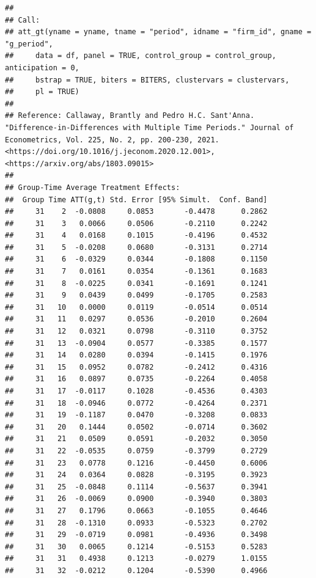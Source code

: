 \documentclass[
]{article}
\begin{document}
\begin{verbatim}
## 
## Call:
## att_gt(yname = yname, tname = "period", idname = "firm_id", gname = "g_period", 
##     data = df, panel = TRUE, control_group = control_group, anticipation = 0, 
##     bstrap = TRUE, biters = BITERS, clustervars = clustervars, 
##     pl = TRUE)
## 
## Reference: Callaway, Brantly and Pedro H.C. Sant'Anna.  "Difference-in-Differences with Multiple Time Periods." Journal of Econometrics, Vol. 225, No. 2, pp. 200-230, 2021. <https://doi.org/10.1016/j.jeconom.2020.12.001>, <https://arxiv.org/abs/1803.09015> 
## 
## Group-Time Average Treatment Effects:
##  Group Time ATT(g,t) Std. Error [95% Simult.  Conf. Band] 
##     31    2  -0.0808     0.0853       -0.4478      0.2862 
##     31    3   0.0066     0.0506       -0.2110      0.2242 
##     31    4   0.0168     0.1015       -0.4196      0.4532 
##     31    5  -0.0208     0.0680       -0.3131      0.2714 
##     31    6  -0.0329     0.0344       -0.1808      0.1150 
##     31    7   0.0161     0.0354       -0.1361      0.1683 
##     31    8  -0.0225     0.0341       -0.1691      0.1241 
##     31    9   0.0439     0.0499       -0.1705      0.2583 
##     31   10   0.0000     0.0119       -0.0514      0.0514 
##     31   11   0.0297     0.0536       -0.2010      0.2604 
##     31   12   0.0321     0.0798       -0.3110      0.3752 
##     31   13  -0.0904     0.0577       -0.3385      0.1577 
##     31   14   0.0280     0.0394       -0.1415      0.1976 
##     31   15   0.0952     0.0782       -0.2412      0.4316 
##     31   16   0.0897     0.0735       -0.2264      0.4058 
##     31   17  -0.0117     0.1028       -0.4536      0.4303 
##     31   18  -0.0946     0.0772       -0.4264      0.2371 
##     31   19  -0.1187     0.0470       -0.3208      0.0833 
##     31   20   0.1444     0.0502       -0.0714      0.3602 
##     31   21   0.0509     0.0591       -0.2032      0.3050 
##     31   22  -0.0535     0.0759       -0.3799      0.2729 
##     31   23   0.0778     0.1216       -0.4450      0.6006 
##     31   24   0.0364     0.0828       -0.3195      0.3923 
##     31   25  -0.0848     0.1114       -0.5637      0.3941 
##     31   26  -0.0069     0.0900       -0.3940      0.3803 
##     31   27   0.1796     0.0663       -0.1055      0.4646 
##     31   28  -0.1310     0.0933       -0.5323      0.2702 
##     31   29  -0.0719     0.0981       -0.4936      0.3498 
##     31   30   0.0065     0.1214       -0.5153      0.5283 
##     31   31   0.4938     0.1213       -0.0279      1.0155 
##     31   32  -0.0212     0.1204       -0.5390      0.4966 

\end{verbatim}
\end{document}
